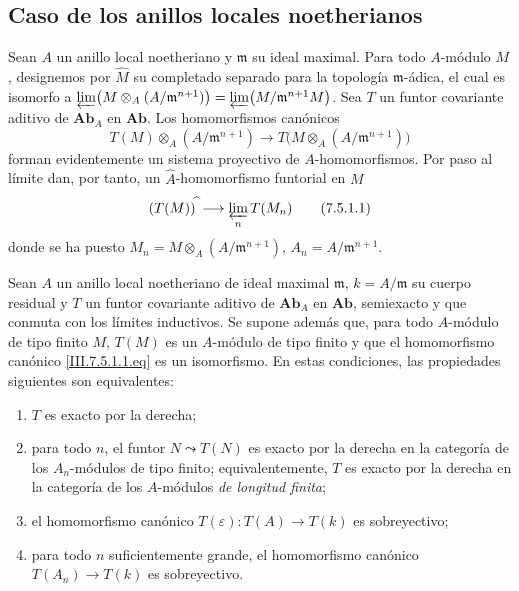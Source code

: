 \subsection{Caso de los anillos locales noetherianos}
\label{subsection:III.7.5}
\label{subsection:III.7.5.fr}

\begin{env}[7.5.1]
\label{III.7.5.1}
Sean $A$ un anillo local noetheriano y $\mathfrak m$ su ideal
maximal. Para todo $A$-módulo $M$, designemos por $\widehat M$ su
completado separado para la topología $\mathfrak m$-ádica, el cual es
isomorfo a
$\varprojlim\bigl(M\otimes_A(A/\mathfrak m^{n+1})\bigr)=\varprojlim\bigl(M/\mathfrak m^{n+1}M\bigr)$.
Sea $T$ un funtor covariante aditivo de $\boldsymbol{Ab}_A$ en
$\boldsymbol{Ab}$. Los homomorfismos canónicos
\[
  T(M)\otimes_A(A/\mathfrak m^{n+1})
  \longrightarrow
  T\bigl(M\otimes_A(A/\mathfrak m^{n+1})\bigr)
\]
forman evidentemente un sistema proyectivo de $A$-homomorfismos. Por
paso al límite dan, por tanto, un $\widehat A$-homomorfismo funtorial
en $M$
\[
  (T(M))^{\widehat{\,}}
  \longrightarrow
  \varprojlim_n T(M_n)
  \tag{7.5.1.1}\label{III.7.5.1.1.fr}
\]
donde se ha puesto
$M_n=M\otimes_A(A/\mathfrak m^{n+1})$, $A_n=A/\mathfrak m^{n+1}$.
\end{env}

\begin{proposition}[7.5.2]
\label{III.7.5.2}
Sean $A$ un anillo local noetheriano de ideal maximal $\mathfrak m$,
$k=A/\mathfrak m$ su cuerpo residual y $T$ un funtor covariante
aditivo de $\mathbf{Ab}_A$ en $\mathbf{Ab}$, semiexacto y que conmuta con
los límites inductivos. Se supone además que, para todo $A$-módulo
de tipo finito $M$, $T(M)$ es un $A$-módulo de tipo finito y que el
homomorfismo canónico \eqref{III.7.5.1.1.eq} es un isomorfismo. En
estas condiciones, las propiedades siguientes son equivalentes:
\begin{enumerate}
  \item[(a)] $T$ es exacto por la derecha;
  \item[(b)] para todo $n$, el funtor $N\leadsto T(N)$ es exacto por
    la derecha en la categoría de los $A_n$-módulos de tipo finito;
    equivalentemente, $T$ es exacto por la derecha en la categoría
    de los $A$-módulos \emph{de longitud finita};
  \item[(c)] el homomorfismo canónico
    $T(\varepsilon):T(A)\longrightarrow T(k)$
    es sobreyectivo;
  \item[(d)] para todo $n$ suficientemente grande, el homomorfismo
    canónico
    $T(A_n)\longrightarrow T(k)$ es sobreyectivo.
\end{enumerate}
\end{proposition}

